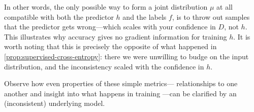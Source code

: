 \documentclass[twoside]{article}
\theoremstyle{plain}
\newtheorem{prop}[theorem]{Proposition}
\theoremstyle{definition}
\begin{document}
In other words, the only possible way to form a joint distribution $\mu$ at all compatible with both the predictor $h$ and the labels $f$, is to throw out samples that the predictor gets wrong---which scales with your confidence in $D$, not $h$.
This illustrates why accuracy gives no gradient information for training $h$.
It is worth noting that this is precisely
the opposite of what happened in \cref{prop:supervised-cross-entropy}: there we were unwilling to budge on the input distribution, and 
the inconsistency scaled with the confidence in $h$.
%

Observe how even properties of these simple metrics---%
relationships to one another and insight into what happens in training%
	---can be clarified by an (inconsistent) underlying model.


\end{document}
